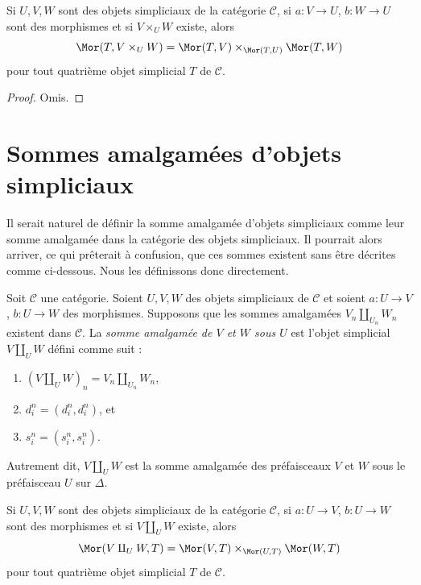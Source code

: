 \begin{lemma}
\label{lemma-fibre-product}
Si $U, V, W$ sont des objets simpliciaux de la catégorie $\mathcal{C}$,
si $a : V \to U$, $b : W \to U$ sont des morphismes et si
$V \times_U W$ existe, alors
$$
\Mor(T, V \times_U W) =
\Mor(T, V) \times_{\Mor(T, U)}
\Mor(T, W)
$$
pour tout quatrième objet simplicial $T$ de $\mathcal{C}$.
\end{lemma}

\begin{proof}
Omis.
\end{proof}

\section{Sommes amalgamées d'objets simpliciaux}
\label{section-push-outs}

\noindent
Il serait naturel de définir la somme amalgamée d'objets simpliciaux comme
leur somme amalgamée dans la catégorie des objets simpliciaux. Il pourrait
alors arriver, ce qui prêterait à confusion, que ces sommes existent sans
être décrites comme ci-dessous. Nous les définissons donc directement.

\begin{definition}
\label{definition-push-out}
Soit $\mathcal{C}$ une catégorie. Soient $U, V, W$ des objets simpliciaux
de $\mathcal{C}$ et soient $a : U \to V$, $b : U \to W$ des morphismes.
Supposons que les sommes amalgamées $V_n \amalg_{U_n} W_n$ existent dans
$\mathcal{C}$. La {\it somme amalgamée de $V$ et $W$ sous $U$} est
l'objet simplicial $V\amalg_U W$ défini comme suit :
\begin{enumerate}
\item $(V \amalg_U W)_n = V_n \amalg_{U_n} W_n$,
\item $d^n_i = (d^n_i, d^n_i)$, et
\item $s^n_i = (s^n_i, s^n_i)$.
\end{enumerate}
Autrement dit, $V\amalg_U W$ est la somme amalgamée des préfaisceaux
$V$ et $W$ sous le préfaisceau $U$ sur $\Delta$.
\end{definition}

\begin{lemma}
\label{lemma-push-out}
Si $U, V, W$ sont des objets simpliciaux de la catégorie $\mathcal{C}$,
si $a : U \to V$, $b : U \to W$ sont des morphismes et si
$V\amalg_U W$ existe, alors
$$
\Mor(V\amalg_U W, T) =
\Mor(V, T) \times_{\Mor(U, T)}
\Mor(W, T)
$$
pour tout quatrième objet simplicial $T$ de $\mathcal{C}$.
\end{lemma}

